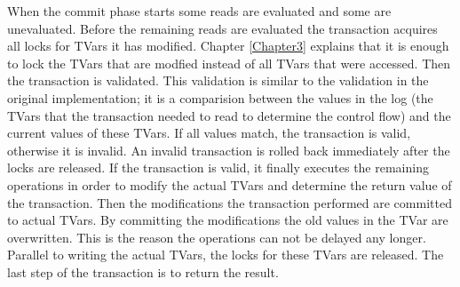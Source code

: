 When the commit phase starts some reads are evaluated and some are unevaluated. Before the remaining
reads are evaluated the transaction acquires all locks for TVars it has modified. Chapter \ref{Chapter3} explains that it 
is enough to lock the TVars that are modfied instead of all TVars that were accessed. Then the transaction is validated.
This validation is similar to the validation in the original implementation; it is a comparision between
the values in the log (the TVars that the transaction needed to read to determine the control flow) and
the current values of these TVars. If all values match, the transaction is valid, otherwise it is invalid.
An invalid transaction is rolled back immediately after the locks are released. If the transaction is
valid, it finally executes the remaining  operations in order to modify the 
actual TVars and determine the return value of the transaction. Then the modifications the transaction 
performed are committed to actual TVars. By committing the modifications the old values in the TVar are 
overwritten. This is the reason the  operations can not be delayed any longer. 
Parallel to writing the actual TVars, the locks for these TVars are released. The last step of the transaction 
is to return the result. 

